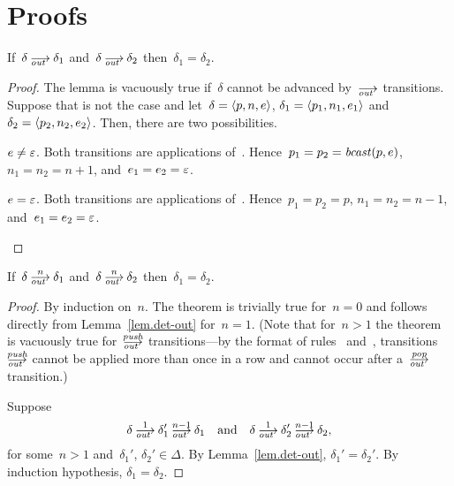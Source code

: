\appendix
\section{Proofs}
\label{sec.proofs}



\begin{lemma}\label{lem.det-out}
  If~$\delta\out\delta_1$ and~$\delta\out\delta_2$ then~$\delta_1=\delta_2$.
\end{lemma}
\begin{proof}
  The lemma is vacuously true if~$\delta$ cannot be advanced by~$\out$
  transitions.  Suppose that is not the case and let~$\delta=\<p,n,e>$,
  $\delta_1=\<p_1,n_1,e_1>$ and~$\delta_2=\<p_2,n_2,e_2>$.  Then, there are
  two possibilities.
  \begin{case}
    $e\ne\varepsilon$.  Both transitions are applications of~.
    Hence~$p_1=p_2=\operatorname{\mathit{bcast}}(p,e)$, $n_1=n_2=n+1$, and~$e_1=e_2=\varepsilon$.
  \end{case}
  \begin{case}
    $e=\varepsilon$.  Both transitions are applications of~.
    Hence~$p_1=p_2=p$, $n_1=n_2=n-1$, and~$e_1=e_2=\varepsilon$.\qedhere
  \end{case}
\end{proof}


\begin{theorem}\label{thm.det-out-pop-n}
  If~$\delta\out[n]\delta_1$ and~$\delta\out[n]\delta_2$
  then~$\delta_1=\delta_2$.
\end{theorem}
\begin{proof}
  By induction on~$n$.
  The theorem is trivially true for~$n=0$ and follows directly from
  Lemma~\ref{lem.det-out} for~$n=1$.  (Note that for~$n>1$ the theorem is
  vacuously true for~$\outpush$ transitions---by the format of
  rules~ and~, transitions~$\outpush$ cannot be applied more
  than once in a row and cannot occur after a~$\outpop$ transition.)

  Suppose
  \[
    \delta\out[1]\delta_1'\out[n-1]\delta_1
    \quad\text{and}\quad
    \delta\out[1]\delta_2'\out[n-1]\delta_2,
  \]
  for some~$n>1$ and~$\delta_1'$, $\delta_2'\in\Delta$.
  By Lemma~\ref{lem.det-out}, $\delta_1'=\delta_2'$.  By induction
  hypothesis, $\delta_1=\delta_2$.\qedhere
\end{proof}

